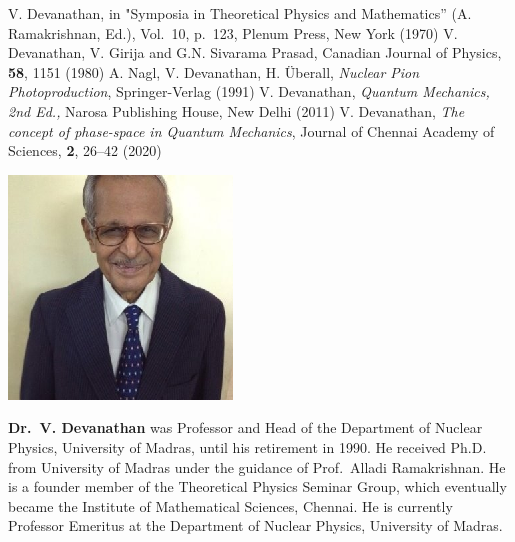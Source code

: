 \begin{thebibliography}{99}
 V. Devanathan, in "Symposia in Theoretical Physics and Mathematics” (A. Ramakrishnan, Ed.), Vol.\ 10, p.\ 123, Plenum Press, New York (1970)
 V. Devanathan, V. Girija and G.N. Sivarama Prasad, Canadian Journal of Physics, \textbf{58}, 1151 (1980)
 A. Nagl, V. Devanathan, H. Überall, \textit{Nuclear Pion Photoproduction}, Springer-Verlag (1991)
 V. Devanathan, \textit{Quantum Mechanics, 2nd Ed.,} Narosa Publishing House, New Delhi (2011)
 V. Devanathan, \textit{The concept of phase-space in Quantum Mechanics}, Journal of Chennai Academy of Sciences, \textbf{2}, 26--42 (2020)
\end{thebibliography}
\newpage

\centerline{\includegraphics{authorsphotos/V_Devanathan.eps}}
\smallskip


\noindent
\textbf{Dr.\ V. Devanathan} was Professor and Head of the Department of Nuclear Physics, University of Madras, until his retirement in 1990. He received Ph.D. from University of Madras under the guidance of Prof.\ Alladi Ramakrishnan. He is a founder member of the Theoretical Physics Seminar Group, which eventually became the Institute of Mathematical Sciences, Chennai. He is currently Professor Emeritus at the Department of Nuclear Physics, University of Madras.
